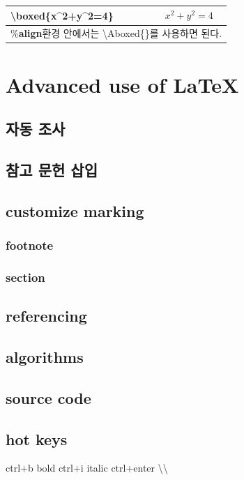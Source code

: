 \documentclass[12pt]{article}
\begin{document}
	\begin{tabularx}{\textwidth\onehalfspacing}{|X|X|}
		\hline
		\textbackslash boxed\{x\textasciicircum2+y\textasciicircum2=4\}&\[\boxed{x^2+y^2=4}\]\\
		\hline
		\multicolumn{2}{|l|}{	\%\textbf{align}환경 안에서는 \textbackslash Aboxed\{\}를 사용하면 된다.}\\
		\hline
	\end{tabularx}\clearpage
	\section{Advanced use of \LaTeX}
	\subsection{자동 조사}
	\subsection{참고 문헌 삽입}
	\subsection{customize marking}
	\subsubsection{footnote}
	\subsubsection{section}
	\subsection{referencing}
	\subsection{algorithms}
	\subsection{source code}
	\subsection{hot keys}
	ctrl+b bold
	ctrl+i italic
	ctrl+enter \textbackslash\textbackslash
\end{document}

